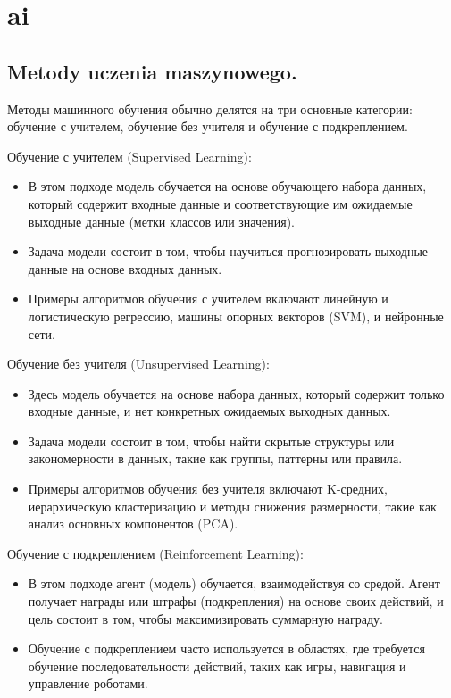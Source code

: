 \chapter{ai}

\section{Metody uczenia maszynowego.}
Методы машинного обучения обычно делятся на три основные категории: обучение с учителем, обучение без учителя и обучение с подкреплением.

Обучение с учителем (Supervised Learning):
\begin{itemize}
\item В этом подходе модель обучается на основе обучающего набора данных, который содержит входные данные и соответствующие им ожидаемые выходные данные (метки классов или значения).
\item Задача модели состоит в том, чтобы научиться прогнозировать выходные данные на основе входных данных.
\item Примеры алгоритмов обучения с учителем включают линейную и логистическую регрессию, машины опорных векторов (SVM), и нейронные сети.
\end{itemize}

Обучение без учителя (Unsupervised Learning):
\begin{itemize}
\item Здесь модель обучается на основе набора данных, который содержит только входные данные, и нет конкретных ожидаемых выходных данных.
\item Задача модели состоит в том, чтобы найти скрытые структуры или закономерности в данных, такие как группы, паттерны или правила.
\item Примеры алгоритмов обучения без учителя включают K-средних, иерархическую кластеризацию и методы снижения размерности, такие как анализ основных компонентов (PCA).
\end{itemize}

Обучение с подкреплением (Reinforcement Learning):
\begin{itemize}
\item В этом подходе агент (модель) обучается, взаимодействуя со средой. Агент получает награды или штрафы (подкрепления) на основе своих действий, и цель состоит в том, чтобы максимизировать суммарную награду.
\item Обучение с подкреплением часто используется в областях, где требуется обучение последовательности действий, таких как игры, навигация и управление роботами.
\end{itemize}

